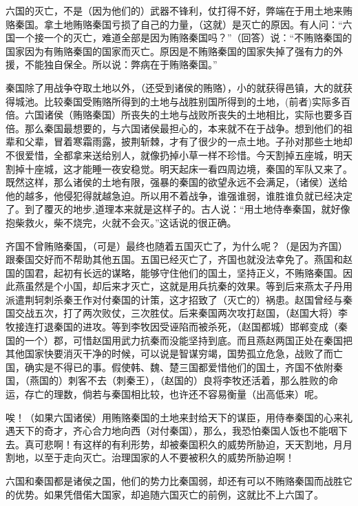 \documentclass[12pt,UTF-8,openany,a4]{ctexbook}
\begin{document}
\begin{large}\yiwen
    
    六国的灭亡，不是（因为他们的）武器不锋利，仗打得不好，弊端在于用土地来贿赂秦国。拿土地贿赂秦国亏损了自己的力量，（这就）是灭亡的原因。有人问：“六国一个接一个的灭亡，难道全部是因为贿赂秦国吗？”（回答）说：“不贿赂秦国的国家因为有贿赂秦国的国家而灭亡。原因是不贿赂秦国的国家失掉了强有力的外援，不能独自保全。所以说：弊病在于贿赂秦国。”
    
    秦国除了用战争夺取土地以外，（还受到诸侯的贿赂），小的就获得邑镇，大的就获得城池。比较秦国受贿赂所得到的土地与战胜别国所得到的土地，(前者)实际多百倍。六国诸侯（贿赂秦国）所丧失的土地与战败所丧失的土地相比，实际也要多百倍。那么秦国最想要的，与六国诸侯最担心的，本来就不在于战争。想到他们的祖辈和父辈，冒着寒霜雨露，披荆斩棘，才有了很少的一点土地。子孙对那些土地却不很爱惜，全都拿来送给别人，就像扔掉小草一样不珍惜。今天割掉五座城，明天割掉十座城，这才能睡一夜安稳觉。明天起床一看四周边境，秦国的军队又来了。既然这样，那么诸侯的土地有限，强暴的秦国的欲望永远不会满足，（诸侯）送给他的越多，他侵犯得就越急迫。所以用不着战争，谁强谁弱，谁胜谁负就已经决定了。到了覆灭的地步,道理本来就是这样子的。古人说：“用土地侍奉秦国，就好像抱柴救火，柴不烧完，火就不会灭。”这话说的很正确。
    
    齐国不曾贿赂秦国，（可是）最终也随着五国灭亡了，为什么呢？（是因为齐国）跟秦国交好而不帮助其他五国。五国已经灭亡了，齐国也就没法幸免了。燕国和赵国的国君，起初有长远的谋略，能够守住他们的国土，坚持正义，不贿赂秦国。因此燕虽然是个小国，却后来才灭亡，这就是用兵抗秦的效果。等到后来燕太子丹用派遣荆轲刺杀秦王作对付秦国的计策，这才招致了（灭亡的）祸患。赵国曾经与秦国交战五次，打了两次败仗，三次胜仗。后来秦国两次攻打赵国，（赵国大将）李牧接连打退秦国的进攻。等到李牧因受诬陷而被杀死，（赵国都城）邯郸变成（秦国的一个）郡，可惜赵国用武力抗秦而没能坚持到底。而且燕赵两国正处在秦国把其他国家快要消灭干净的时候，可以说是智谋穷竭，国势孤立危急，战败了而亡国，确实是不得已的事。假使韩、魏、楚三国都爱惜他们的国土，齐国不依附秦国，（燕国的）刺客不去（刺秦王），（赵国的）良将李牧还活着，那么胜败的命运，存亡的理数，倘若与秦国相比较，也许还不容易衡量（出高低来）呢。
    
    唉！（如果六国诸侯）用贿赂秦国的土地来封给天下的谋臣，用侍奉秦国的心来礼遇天下的奇才，齐心合力地向西（对付秦国），那么，我恐怕秦国人饭也不能咽下去。真可悲啊！有这样的有利形势，却被秦国积久的威势所胁迫，天天割地，月月割地，以至于走向灭亡。治理国家的人不要被积久的威势所胁迫啊！
    
    六国和秦国都是诸侯之国，他们的势力比秦国弱，却还有可以不贿赂秦国而战胜它的优势。如果凭借偌大国家，却追随六国灭亡的前例，这就比不上六国了。
    

\end{large}
\end{document}
